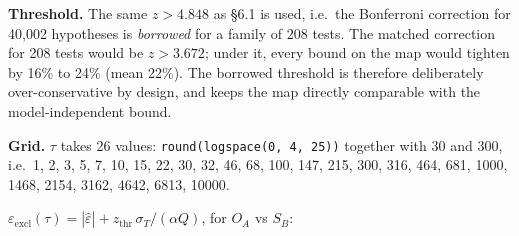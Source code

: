 \documentclass[
  11pt,
]{article}
\begin{document}
\textbf{Threshold.} The same \(z > 4.848\) as \S6.1 is used, i.e.~the
Bonferroni correction for 40,002 hypotheses is \emph{borrowed} for a
family of 208 tests. The matched correction for 208 tests would be
\(z > 3.672\); under it, every bound on the map would tighten by 16\% to
24\% (mean 22\%). The borrowed threshold is therefore deliberately
over-conservative by design, and keeps the map directly comparable with
the model-independent bound.

\textbf{Grid.} \(\tau\) takes 26 values:
\texttt{round(logspace(0, 4, 25))} together with 30 and 300, i.e.~1, 2,
3, 5, 7, 10, 15, 22, 30, 32, 46, 68, 100, 147, 215, 300, 316, 464, 681,
1000, 1468, 2154, 3162, 4642, 6813, 10000.

\(\varepsilon_{\mathrm{excl}}(\tau) = |\hat\varepsilon| + z_{\mathrm{thr}}\,\sigma_T/(\alpha Q)\),
for \(O_A\) vs \(S_B\):
\end{document}

